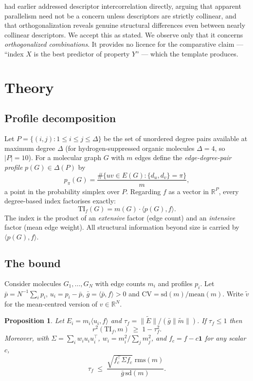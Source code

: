 \documentclass[11pt,a4paper]{article}
\theoremstyle{plain}
\newtheorem{proposition}{Proposition}
\newcommand{\TI}{\mathrm{TI}}
\newcommand{\CV}{\mathrm{CV}}
\newcommand{\rms}{\mathrm{rms}}
\newcommand{\sd}{\mathrm{sd}}
\begin{document}
\citet{randic1994} had earlier addressed descriptor intercorrelation directly, arguing
that apparent parallelism need not be a concern unless descriptors are strictly collinear,
and that orthogonalization reveals genuine structural differences even between nearly
collinear descriptors. We accept this as stated. We observe only that it concerns
\emph{orthogonalized combinations}. It provides no licence for the comparative claim
--- ``index $X$ is the best predictor of property $Y$'' --- which the template produces.

\section{Theory}

\subsection{Profile decomposition}

Let $P=\{(i,j):1\le i\le j\le \Delta\}$ be the set of unordered degree pairs available at
maximum degree $\Delta$ (for hydrogen-suppressed organic molecules $\Delta=4$, so
$|P|=10$). For a molecular graph $G$ with $m$ edges define the \emph{edge-degree-pair
profile} $p(G)\in\Delta(P)$ by
\[
p_\pi(G)=\frac{\#\{uv\in E(G):\{d_u,d_v\}=\pi\}}{m},
\]
a point in the probability simplex over $P$. Regarding $f$ as a vector in $\mathbb{R}^P$,
every degree-based index factorises exactly:
\begin{equation}
\TI_f(G)=m(G)\cdot\langle p(G),f\rangle .
\label{eq:factor}
\end{equation}
The index is the product of an \emph{extensive} factor (edge count) and an
\emph{intensive} factor (mean edge weight). All structural information beyond size is
carried by $\langle p(G),f\rangle$.

\subsection{The bound}

Consider molecules $G_1,\dots,G_N$ with edge counts $m_i$ and profiles $p_i$. Let
$\bar p=N^{-1}\sum_i p_i$, $u_i=p_i-\bar p$, $\bar g=\langle\bar p,f\rangle>0$ and
$\CV=\sd(m)/\mathrm{mean}(m)$. Write $\tilde v$ for the mean-centred version of
$v\in\mathbb{R}^N$.

\begin{proposition}
Let $E_i=m_i\langle u_i,f\rangle$ and $\tau_f=\|\tilde E\|/(\bar g\|\tilde m\|)$. If
$\tau_f\le1$ then
\begin{equation}
r^2(\TI_f,m)\;\ge\;1-\tau_f^2 .
\label{eq:bound}
\end{equation}
Moreover, with $\Sigma=\sum_i w_i u_iu_i^{\!\top}$, $w_i=m_i^2/\sum_j m_j^2$, and
$f_c=f-c\mathbf{1}$ for any scalar $c$,
\begin{equation}
\tau_f\;\le\;\frac{\sqrt{f_c^{\!\top}\Sigma f_c}\;\rms(m)}{\bar g\,\sd(m)} .
\label{eq:spectral}
\end{equation}
\end{proposition}
\end{document}
